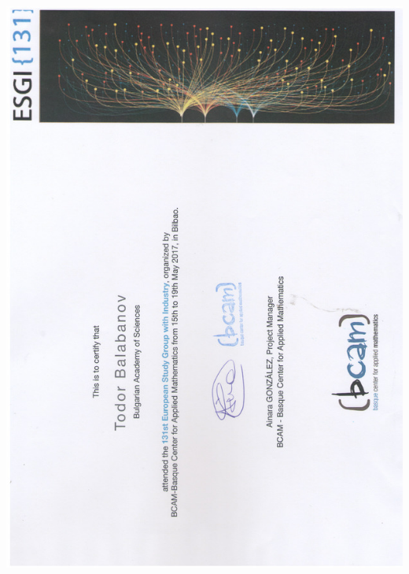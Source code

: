 \documentclass[bulgarian,a4paper]{europasscv}
\begin{document}
\includegraphics[width=\textwidth,height=\textheight,keepaspectratio]{131ESGI2017}
\end{document}
